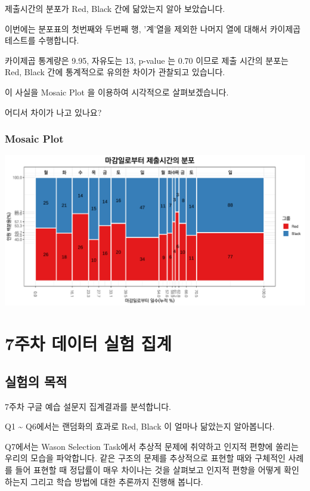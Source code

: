 \documentclass[
]{book}
\begin{document}
제출시간의 분포가 Red, Black 간에 닮았는지 알아 보았습니다.

이번에는 분포표의 첫번째와 두번째 행, '계'열을 제외한 나머지 열에 대해서 카이제곱테스트를 수행합니다.

카이제곱 통계량은 9.95, 자유도는 13, p-value 는 0.70 이므로 제출 시간의 분포는 Red, Black 간에 통계적으로 유의한 차이가 관찰되고 있습니다.

이 사실을 Mosaic Plot 을 이용하여 시각적으로 살펴보겠습니다.

어디서 차이가 나고 있나요?

\subsection{Mosaic Plot}\label{mosaic-plot-11}

\includegraphics{Quiz_report_2025_files/figure-latex/unnamed-chunk-167-1.pdf}

\chapter{7주차 데이터 실험 집계}\label{uxc8fcuxcc28-uxb370uxc774uxd130-uxc2e4uxd5d8-uxc9d1uxacc4-6}

\section{실험의 목적}\label{uxc2e4uxd5d8uxc758-uxbaa9uxc801-6}

7주차 구글 예습 설문지 집계결과를 분석합니다.

Q1 \textasciitilde{} Q6에서는 랜덤화의 효과로 Red, Black 이 얼마나 닮았는지 알아봅니다.

Q7에서는 Wason Selection Task에서 추상적 문제에 취약하고 인지적 편향에 쏠리는 우리의 모습을 파악합니다. 같은 구조의 문제를 추상적으로 표현할 때와 구체적인 사례를 들어 표현할 때 정답률이 매우 차이나는 것을 살펴보고 인지적 편향을 어떻게 확인하는지 그리고 학습 방법에 대한 추론까지 진행해 봅니다.
\end{document}
